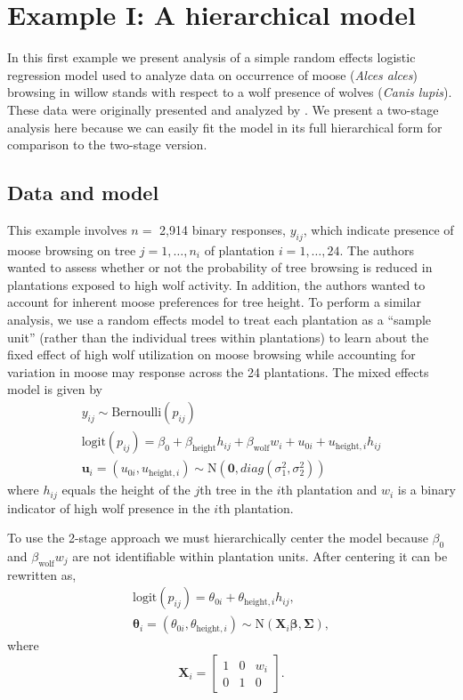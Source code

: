 \documentclass[12pt]{article}
\newcommand{\bt}{\boldsymbol{\theta}}
\newcommand{\bb}{\boldsymbol{\beta}}
\newcommand{\bSig}{\boldsymbol{\Sigma}}
\begin{document}
\section{Example I: A hierarchical model} \label{sec:moose.wolf}

In this first example we present analysis of a simple random effects logistic regression model used to analyze data on occurrence of moose ({\it Alces alces}) browsing in willow stands with respect to a wolf presence of wolves ({\it Canis lupis}). These data were originally presented and analyzed by \cite{van2018does}. We present a two-stage analysis here because we can easily fit the model in its full hierarchical form for comparison to the two-stage version. 

\subsection{Data and model}

This example involves $n =$ 2,914 binary responses, $y_{ij}$, which indicate presence of moose browsing on tree $j=1,\dots,n_i$ of plantation $i=1,\dots,24$. The authors wanted to assess whether or not the probability of tree browsing is reduced in plantations exposed to high wolf activity. In addition, the authors wanted to account for inherent moose preferences for tree height. To perform a similar analysis, we use a random effects model to treat each plantation as a ``sample unit'' (rather than the individual trees within plantations) to learn about the fixed effect of high wolf utilization on moose browsing while accounting for variation in moose may response across the 24 plantations. The mixed effects model is given by
\[
\begin{gathered}
y_{ij} \sim \text{Bernoulli}(p_{ij}) \\
\text{logit}(p_{ij}) = \beta_0 + \beta_{\text{height}}h_{ij} + \beta_{\text{wolf}}w_i + u_{0i} + u_{\text{height},i} h_{ij}\\
\mathbf{u}_i = (u_{0i}, u_{\text{height},i}) \sim \text{N}(\mathbf{0},diag(\sigma_1^2, \sigma_2^2))
\end{gathered}
\]
where $h_{ij}$ equals the height of the $j$th tree in the $i$th plantation and $w_i$ is a binary indicator of high wolf presence in the $i$th plantation.

To use the 2-stage approach we must hierarchically center the model because $\beta_0$ and $\beta_{\text{wolf}}w_j$ are not identifiable within plantation units. After centering it can be rewritten as,
\[
\begin{gathered}
\text{logit}(p_{ij}) = \theta_{0i} + \theta_{\text{height},i}h_{ij},\\
\bt_i = (\theta_{0i}, \theta_{\text{height},i}) \sim \text{N}(\mathbf{X}_i\bb, \bSig) ,
\end{gathered}
\]
where
\[
\mathbf{X}_i = \left[ 
\begin{array}{ccc}
1 & 0 & w_i \\
0 & 1 & 0
\end{array}
\right].
\]
\end{document}
